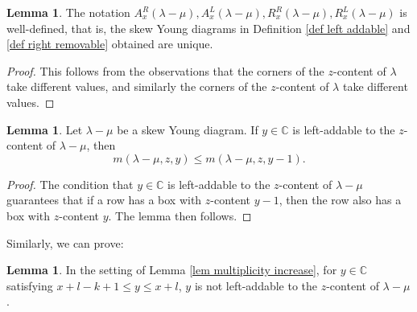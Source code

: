 \documentclass[11pt]{amsart}
\numberwithin{equation}{section}
\theoremstyle{definition}
\newtheorem{lemma}[thm]{Lemma}
\newtheorem{example}[thm]{Example}
\begin{document}


\begin{lemma}
The notation $A^R_x(\lambda-\mu), A^L_x(\lambda-\mu), R^R_x(\lambda-\mu), R^L_x(\lambda-\mu)$ is well-defined, that is, the skew Young diagrams in Definition  \ref{def left addable} and \ref{def right removable} obtained are unique. 
\end{lemma}

\begin{proof}
This follows from the observations that the corners of the $z$-content of $\lambda$ take different values, and similarly the corners of the $z$-content of $\lambda$ take different values.
\end{proof}



\begin{lemma} \label{lem addable property}
Let $\lambda-\mu$ be a skew Young diagram. If $y \in \mathbb C$ is left-addable to the $z$-content of $\lambda -\mu$, then 
\[  m(\lambda-\mu, z, y) \leq m(\lambda-\mu, z, y-1) .
\]
\end{lemma}

\begin{proof}
The condition that $y \in \mathbb C$ is left-addable to the $z$-content of $\lambda-\mu$ guarantees that if a row has a box with $z$-content $y-1$, then the row also has a box with $z$-content $y$. The lemma then follows.
\end{proof}

Similarly, we can prove:





\begin{lemma} \label{lem addable control}
In the setting of Lemma \ref{lem multiplicity increase}, for $y \in \mathbb C$ satisfying $x+l- k+1 \leq y \leq x+l$, $y$ is not  left-addable to the $z$-content of $\lambda-\mu$. 
\end{lemma}
\end{document}
